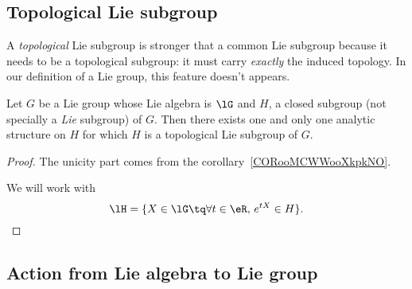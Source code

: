 \subsection{Topological Lie subgroup}

\begin{remark}
	A \textit{topological} Lie subgroup is stronger that a common Lie subgroup because it needs to be a topological subgroup: it must carry \emph{exactly} the induced topology. In our definition of a Lie group, this feature doesn't appears.
\end{remark}

\begin{theorem} \label{THOooXVXBooZDJzQo}
	Let $G$ be a Lie group whose Lie algebra is $\lG$ and $H$, a closed subgroup (not specially a \emph{Lie} subgroup) of $G$. Then there exists one and only one analytic structure on $H$ for which $H$ is a topological Lie subgroup of $G$.
\end{theorem}


\begin{proof}
	The unicity part comes from the corollary~\ref{CORooMCWWooXkpkNO}.

	We will work with
	\begin{equation}\label{eq:lH_de_G}
		\lH=\{X\in\lG\tq \forall t\in\eR,\, e^{tX}\in H\}.
	\end{equation}
\end{proof}

\subsection{Action from Lie algebra to Lie group}

